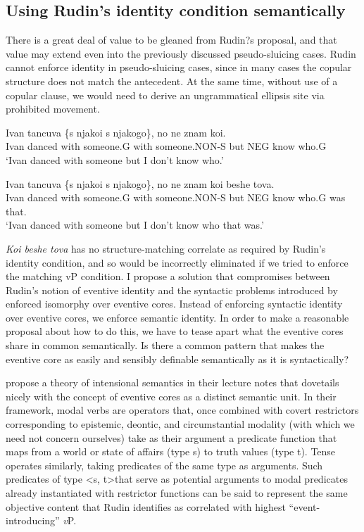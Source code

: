 \documentclass{turabian-researchpaper}
\begin{document}
\subsection{Using Rudin's identity condition semantically}
There is a great deal of value to be gleaned from Rudin?s proposal, and that value may extend even into the previously discussed pseudo-sluicing cases. Rudin cannot enforce identity in pseudo-sluicing cases, since in many cases the copular structure does not match the antecedent. At the same time, without use of a copular clause, we would need to derive an ungrammatical ellipsis site via prohibited movement. 

\begin{exe}
\gll Ivan tancuva \{s njakoi \textbar s njakogo\}, no ne znam koi. \\
Ivan danced with someone.G with someone.NON-S but NEG know who.G \\
\trans `Ivan danced with someone but I don't know who.'
\end{exe}

\begin{exe}
\ex\label{ivandanced7}
\gll Ivan tancuva \{s njakoi \textbar s njakogo\}, no ne znam koi beshe tova. \\
Ivan danced with someone.G with someone.NON-S but NEG know who.G was that. \\
\trans `Ivan danced with someone but I don't know who that was.'
\end{exe}

\textit{Koi beshe tova} has no structure-matching correlate as required by Rudin's identity condition, and so would be incorrectly eliminated if we tried to enforce the matching vP condition. 
I propose a solution that compromises between Rudin's notion of eventive identity and the syntactic problems introduced by enforced isomorphy over eventive cores. Instead of enforcing syntactic identity over eventive cores, we enforce semantic identity. In order to make a reasonable proposal about how to do this, we have to tease apart what the eventive cores share in common semantically. Is there a common pattern that makes the eventive core as easily and sensibly definable semantically as it is syntactically?

\citet{heimvonfintel} propose a theory of intensional semantics in their lecture notes that dovetails nicely with the concept of eventive cores as a distinct semantic unit. In their framework, modal verbs are operators that, once combined with covert restrictors corresponding to epistemic, deontic, and circumstantial modality (with which we need not concern ourselves) take as their argument a predicate function that maps from a world or state of affairs (type s) to truth values (type t). Tense operates similarly, taking predicates of the same type as arguments. Such predicates of type \textless s, t\textgreater that serve as potential arguments to modal predicates already instantiated with restrictor functions can be said to represent the same objective content that Rudin identifies as correlated with highest ``event-introducing'' \textit{v}P.
\end{document}
